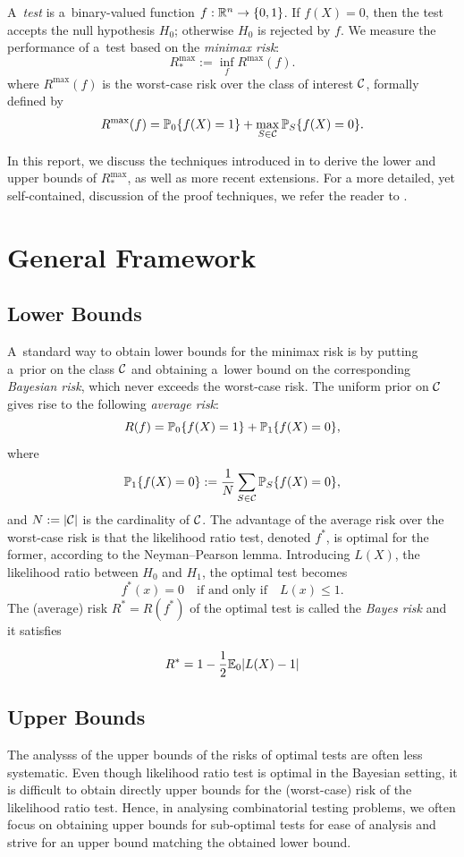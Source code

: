 \documentclass[10pt, oneside]{article}
\begin{document}
A~\textit{test} is a~binary-valued function $f:{\mathbb R}^n \to\{
0,1\}$. If
$f(X)=0$, then the test accepts the null hypothesis $H_0$;
otherwise $H_0$ is rejected by $f$.
We measure the performance of a~test based on the \textit{minimax risk}:
\[
R_*^{\max} := \inf_{f} R^{\max}(f).
\]
where $R^{\max}(f)$ is the worst-case risk over the class of interest ${\mathcal C}$, formally defined by
\[
R^{\max}(f) = \mathbb{P}_0\{f(X)=1\}
+ \max_{S\in{\mathcal C}} \mathbb{P}_S\{f(X)=0\}.
\]

In this report, we discuss the techniques introduced in \cite{arias2012correlation, addario2010combinatorial, arias2011detection} to derive the lower and upper bounds of $R_*^{\max}$, as well as more recent extensions. For a more detailed, yet self-contained, discussion of the proof techniques, we refer the reader to \cite{lugosi2017lectures}.

\section{General Framework}

\subsection{Lower Bounds}
A~standard way to obtain lower bounds for the minimax risk is by putting a~prior on the class ${\mathcal C}$ and obtaining a~lower bound on the corresponding \textit{Bayesian risk}, which never exceeds the worst-case risk. The
uniform prior on ${\mathcal C}$ gives rise to the following \textit{average risk}:
\[
R(f) = \mathbb{P}_0\{f(X)=1\}
+ \mathbb{P}_1\{f(X)=0\},
\]
where
\[
\mathbb{P}_1\{f(X)=0\} := \frac{1}{N}\sum_{S\in{\mathcal C}} \mathbb{P}_S\{f(X)=0\},
\]
and $N := |{\mathcal C}|$ is the cardinality of ${\mathcal C}$.
The advantage of the average risk over the worst-case risk is that the likelihood ratio test, denoted $f^*$, is optimal for the former, according to the Neyman--Pearson lemma. Introducing $L(X)$, the likelihood ratio between $H_0$ and $H_1$, the optimal test becomes
%
\[
f^*(x) = 0  \quad\mbox{if and only if}\quad   L(x) \le 1.
\]
The
(average)
risk $R^*=R(f^*)$ of the optimal test is called the
\textit{Bayes risk} and it satisfies

\[
R^* = 1 - \frac{1}{2} \mathbb{E}_0 |L(X) - 1|
\]

\subsection{Upper Bounds}
The analysss of the upper bounds of the risks of optimal tests are often less systematic. Even though likelihood ratio test is optimal in the
Bayesian setting, it is difficult to obtain directly upper bounds for the (worst-case) risk
of the likelihood ratio test. Hence, in analysing combinatorial testing problems, we often focus on obtaining upper bounds for sub-optimal tests for ease of analysis and strive for an upper bound matching the obtained lower bound.
\end{document}
